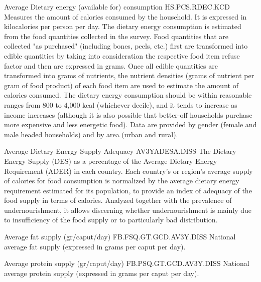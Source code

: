 \begin{MetadataCollection}
\begin{metadata}{ Average Dietary energy (available for) consumption  }{ HS.PCS.RDEC.KCD }
Measures the amount of calories consumed by the household. It is expressed in kilocalories per person per day. The dietary energy consumption is estimated from the food quantities collected in the survey. Food quantities that are collected "as purchased" (including bones, peels, etc.) first are transformed into edible quantities by taking into consideration the respective food item refuse factor and then are expressed in grams. Once all edible quantities are transformed into grams of nutrients, the nutrient densities (grams of nutrient per gram of food product) of each food item are  used to estimate the amount of calories consumed. The dietary energy consumption should be within reasonable ranges from 800 to 4,000 kcal (whichever decile), and it tends to increase as income increases (although it is also possible that better-off households purchase more expensive and less energetic food). Data are provided by gender (female and male headed households) and by area (urban and rural).
\end{metadata}

\begin{metadata}{ Average Dietary Energy Supply Adequacy }{ AV3YADESA.DISS }
The Dietary Energy Supply (DES) as a percentage of the Average Dietary Energy Requirement (ADER) in each country. Each country's or region's average supply of calories for food consumption is normalized by the average dietary energy requirement estimated for its population, to provide an index of adequacy of the food supply in terms of calories. Analyzed together with the prevalence of undernourishment, it allows discerning whether undernourishment is mainly due to insufficiency of the food supply or to particularly bad distribution. 
\end{metadata}

\begin{metadata}{ Average fat supply (gr/caput/day) }{ FB.FSQ.GT.GCD.AV3Y.DISS }
National average fat supply (expressed in grams per caput per day).  
\end{metadata}

\begin{metadata}{ Average protein supply (gr/caput/day) }{ FB.PSQ.GT.GCD.AV3Y.DISS }
National average protein supply (expressed in grams per caput per day).  
\end{metadata}


\end{MetadataCollection}
